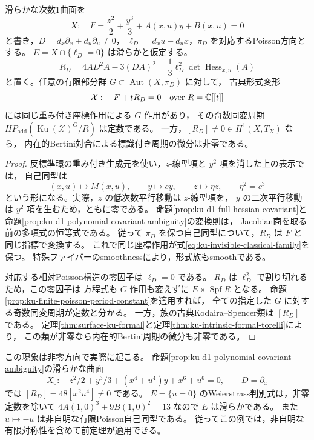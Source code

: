 \begin{theorem}[全ての幾何学的有限Poisson群に見えない補正方向]
\label{thm:ku-poisson-period-blindness}
滑らかな次数1曲面を
\[
 X:\quad F=\frac{z^2}{2}+\frac{y^3}{3}+A(x,u)y+B(x,u)=0
\]
と書き，$D=d_x\partial_x+d_u\partial_u\ne0$，
$\ell_D=d_xu-d_ux$，$\pi_D$ を対応するPoisson方向とする。
$E=X\cap\{\ell_D=0\}$ は滑らかと仮定する。
\[
 R_D=4A D^2A-3(DA)^2
     =\frac13\ell_D^2\det\operatorname{Hess}_{x,u}(A)
\]
と置く。任意の有限部分群 $G\subset\operatorname{Aut}(X,\pi_D)$ に対して，
古典形式変形
\begin{equation}\label{eq:ku-invisible-classical-family}
 \mathcal X:\quad F+tR_D=0
 \quad\text{over }R=\mathbb C[[t]]
\end{equation}
には同じ重み付き座標作用による $G$-作用があり，
その奇数同変周期 $HP_{\mathrm{odd}}(\operatorname{Ku}(\mathcal X)^G/R)$ は定数である。
一方，$[R_D]\ne0\in H^1(X,T_X)$ なら，
内在的Bertini対合による標識付き周期の微分は非零である。
\end{theorem}
\begin{proof}
反標準環の重み付き生成元を使い，$z$-線型項と $y^2$ 項を消した上の表示では，
自己同型は
\[
 (x,u)\longmapsto M(x,u),\qquad y\longmapsto cy,
 \qquad z\longmapsto\eta z,\qquad \eta^2=c^3
\]
という形になる。実際，$z$ の低次数平行移動は $z$-線型項を，
$y$ の二次平行移動は $y^2$ 項を生むため，ともに零である。
命題\ref{prop:ku-d1-full-hessian-covariant}と
命題\ref{prop:ku-d1-polynomial-covariant-ambiguity}の変換則は，
Jacobian商を取る前の多項式の恒等式である。
従って $\pi_D$ を保つ自己同型について，$R_D$ は $F$ と同じ指標で変換する。
これで同じ座標作用が式\eqref{eq:ku-invisible-classical-family}を保つ。
特殊ファイバーのsmoothnessにより，形式族もsmoothである。

対応する相対Poisson構造の零因子は $\ell_D=0$ である。
$R_D$ は $\ell_D^2$ で割り切れるため，この零因子は
方程式も $G$-作用も変えずに $E\times\operatorname{Spf}R$ となる。
命題\ref{prop:ku-finite-poisson-period-constant}を適用すれば，
全ての指定した $G$ に対する奇数同変周期が定数と分かる。
一方，族の古典Kodaira--Spencer類は $[R_D]$ である。
定理\ref{thm:surface-ku-formal}と定理\ref{thm:ku-intrinsic-formal-torelli}により，
この類が非零なら内在的Bertini周期の微分も非零である。
\end{proof}

この現象は非零方向で実際に起こる。
命題\ref{prop:ku-d1-polynomial-covariant-ambiguity}の滑らかな曲面
\[
 X_0:\quad z^2/2+y^3/3+(x^4+u^4)y+x^6+u^6=0,
 \qquad D=\partial_x
\]
では $[R_D]=48[x^2u^4]\ne0$ である。
$E=\{u=0\}$ のWeierstrass判別式は，非零定数を除いて
$4A(1,0)^3+9B(1,0)^2=13$ なので $E$ は滑らかである。
また $u\mapsto-u$ は非自明な有限Poisson自己同型である。
従ってこの例では，非自明な有限対称性を含めて前定理が適用できる。

